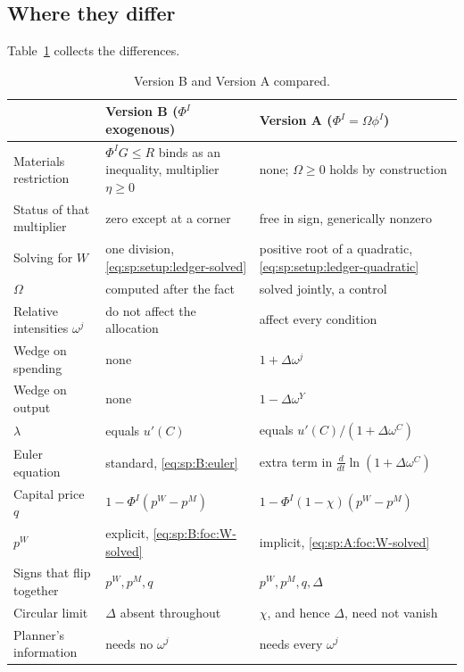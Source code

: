 \subsection{Where they differ}\label{sec:sp:compare:table}

Table~\ref{tab:sp:versions} collects the differences.

\begin{table}[H]
\centering
\caption{Version B and Version A compared.}
\label{tab:sp:versions}
\setlength{\tabcolsep}{5pt}
\renewcommand{\arraystretch}{1.05}
\begin{tabular}{@{}p{}p{}p{}@{}}
\toprule
 & Version B ($\Phi^I$ exogenous) & Version A ($\Phi^I=\Omega\phi^I$) \\
\midrule
Materials restriction & $\Phi^IG\le R$ binds as an inequality, multiplier $\eta\ge0$
& none; $\Omega\ge0$ holds by construction \\
Status of that multiplier & zero except at a corner & free in sign, generically nonzero \\
Solving for $W$ & one division, \eqref{eq:sp:setup:ledger-solved}
& positive root of a quadratic, \eqref{eq:sp:setup:ledger-quadratic} \\
$\Omega$ & computed after the fact & solved jointly, a control \\
Relative intensities $\omega^j$ & do not affect the allocation & affect every condition \\
Wedge on spending & none & $1+\Delta\omega^j$ \\
Wedge on output & none & $1-\Delta\omega^Y$ \\
$\lambda$ & equals $u'(C)$ & equals $u'(C)/\left(1+\Delta\omega^C\right)$ \\
Euler equation & standard, \eqref{eq:sp:B:euler} & extra term in $\frac{d}{dt}\ln\left(1+\Delta\omega^C\right)$ \\
Capital price $q$ & $1-\Phi^I\left(p^W-p^M\right)$ & $1-\Phi^I\left(1-\chi\right)\left(p^W-p^M\right)$ \\
$p^W$ & explicit, \eqref{eq:sp:B:foc:W-solved} & implicit, \eqref{eq:sp:A:foc:W-solved} \\
Signs that flip together & $p^W,p^M,q$ & $p^W,p^M,q,\Delta$ \\
Circular limit & $\Delta$ absent throughout & $\chi$, and hence $\Delta$, need not vanish \\
Planner's information & needs no $\omega^j$ & needs every $\omega^j$ \\
\bottomrule
\end{tabular}
\end{table}

